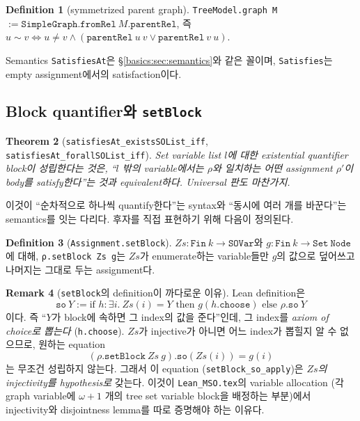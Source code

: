\documentclass[11pt]{article}
\theoremstyle{definition}
\newtheorem{definition}{Definition}[section]
\newtheorem{remark}[definition]{Remark}
\theoremstyle{plain}
\newtheorem{theorem}[definition]{Theorem}
\newcommand{\lean}[1]{\texttt{#1}}
\newcommand{\leanfile}[1]{\texttt{#1}}
\begin{document}
\begin{definition}[symmetrized parent graph]
\label{basics:def:treemodelgraph}
\lean{TreeModel.graph M} $:= \lean{SimpleGraph.fromRel}\ M.\lean{parentRel}$,
즉 $u \sim v \iff u \ne v \land (\lean{parentRel}\ u\ v \lor \lean{parentRel}\ v\ u)$.
\end{definition}

Semantics \lean{SatisfiesAt}은 \S\ref{basics:sec:semantics}와 같은 꼴이며,
\lean{Satisfies}는 empty assignment에서의 satisfaction이다.

\subsection{Block quantifier와 \lean{setBlock}}

\begin{theorem}[\lean{satisfiesAt\_existsSOList\_iff}, \lean{satisfiesAt\_forallSOList\_iff}]
\label{basics:thm:blockquant}
Set variable list $l$에 대한 existential quantifier block이 성립한다는 것은,
``$l$ 밖의 variable에서는 $\rho$와 일치하는 어떤 assignment $\rho'$이 body를
satisfy한다''는 것과 equivalent하다. Universal 판도 마찬가지.
\end{theorem}

이것이 ``순차적으로 하나씩 quantify한다''는 syntax와 ``동시에 여러 개를
바꾼다''는 semantics를 잇는 다리다. 후자를 직접 표현하기 위해 다음이 정의된다.

\begin{definition}[\lean{Assignment.setBlock}]
\label{basics:def:setblock}
$Zs : \lean{Fin}\ k \to \lean{SOVar}$와 $g : \lean{Fin}\ k \to \lean{Set}\ \lean{Node}$에
대해, \lean{ρ.setBlock Zs g}는 $Zs$가 enumerate하는 variable들만 $g$의 값으로
덮어쓰고 나머지는 그대로 두는 assignment다.
\end{definition}

\begin{remark}[\lean{setBlock}의 definition이 까다로운 이유]
\label{basics:rem:setblock}
Lean definition은
\[
  \lean{so}\ Y := \text{if } h : \exists i.\ Zs(i) = Y \text{ then } g(h.\lean{choose}) \text{ else } \rho.\lean{so}\ Y
\]
이다. 즉 ``$Y$가 block에 속하면 그 index의 값을 준다''인데, 그 index를
\emph{axiom of choice로 뽑는다} (\lean{h.choose}). $Zs$가 injective가 아니면
어느 index가 뽑힐지 알 수 없으므로, 원하는 equation
\[
  (\rho.\lean{setBlock}\ Zs\ g).\lean{so}(Zs(i)) = g(i)
\]
는 무조건 성립하지 않는다. 그래서 이 equation (\lean{setBlock\_so\_apply})은
\emph{$Zs$의 injectivity를 hypothesis로} 갖는다. 이것이
\leanfile{Lean\_MSO.tex}의 variable allocation (각 graph variable에 $\omega+1$
개의 tree set variable block을 배정하는 부분)에서 injectivity와 disjointness
lemma를 따로 증명해야 하는 이유다.
\end{remark}
\end{document}
